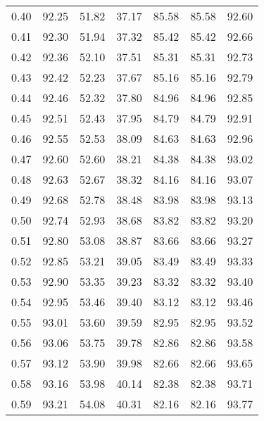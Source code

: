 \begin{tabular}{|c|c|c|c|c|c|c|}
      0.40 &     92.25 &     51.82 &      37.17 &   85.58 &      85.58 &         92.60 \\
      0.41 &     92.30 &     51.94 &      37.32 &   85.42 &      85.42 &         92.66 \\
      0.42 &     92.36 &     52.10 &      37.51 &   85.31 &      85.31 &         92.73 \\
      0.43 &     92.42 &     52.23 &      37.67 &   85.16 &      85.16 &         92.79 \\
      0.44 &     92.46 &     52.32 &      37.80 &   84.96 &      84.96 &         92.85 \\
      0.45 &     92.51 &     52.43 &      37.95 &   84.79 &      84.79 &         92.91 \\
      0.46 &     92.55 &     52.53 &      38.09 &   84.63 &      84.63 &         92.96 \\
      0.47 &     92.60 &     52.60 &      38.21 &   84.38 &      84.38 &         93.02 \\
      0.48 &     92.63 &     52.67 &      38.32 &   84.16 &      84.16 &         93.07 \\
      0.49 &     92.68 &     52.78 &      38.48 &   83.98 &      83.98 &         93.13 \\
      0.50 &     92.74 &     52.93 &      38.68 &   83.82 &      83.82 &         93.20 \\
      0.51 &     92.80 &     53.08 &      38.87 &   83.66 &      83.66 &         93.27 \\
      0.52 &     92.85 &     53.21 &      39.05 &   83.49 &      83.49 &         93.33 \\
      0.53 &     92.90 &     53.35 &      39.23 &   83.32 &      83.32 &         93.40 \\
      0.54 &     92.95 &     53.46 &      39.40 &   83.12 &      83.12 &         93.46 \\
      0.55 &     93.01 &     53.60 &      39.59 &   82.95 &      82.95 &         93.52 \\
      0.56 &     93.06 &     53.75 &      39.78 &   82.86 &      82.86 &         93.58 \\
      0.57 &     93.12 &     53.90 &      39.98 &   82.66 &      82.66 &         93.65 \\
      0.58 &     93.16 &     53.98 &      40.14 &   82.38 &      82.38 &         93.71 \\
      0.59 &     93.21 &     54.08 &      40.31 &   82.16 &      82.16 &         93.77 \\

\end{tabular}
